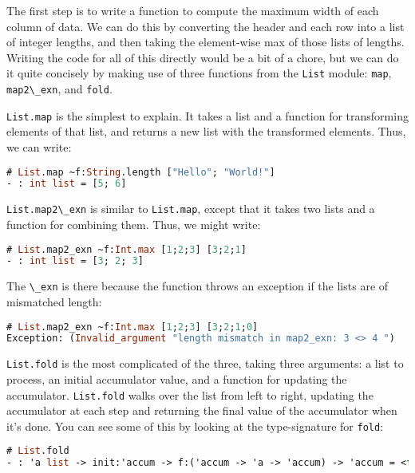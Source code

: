 The first step is to write a function to compute the maximum width of
each column of data. We can do this by converting the header and each
row into a list of integer lengths, and then taking the element-wise max
of those lists of lengths. Writing the code for all of this directly
would be a bit of a chore, but we can do it quite concisely by making
use of three functions from the \passthrough{\lstinline!List!} module:
\passthrough{\lstinline!map!}, \passthrough{\lstinline!map2\_exn!}, and
\passthrough{\lstinline!fold!}.

\passthrough{\lstinline!List.map!} is the simplest to explain. It takes
a list and a function for transforming elements of that list, and
returns a new list with the transformed elements. Thus, we can
write:

\begin{lstlisting}[language=Caml]
# List.map ~f:String.length ["Hello"; "World!"]
- : int list = [5; 6]
\end{lstlisting}

\passthrough{\lstinline!List.map2\_exn!} is similar to
\passthrough{\lstinline!List.map!}, except that it takes two lists and a
function for combining them. Thus, we might write:

\begin{lstlisting}[language=Caml]
# List.map2_exn ~f:Int.max [1;2;3] [3;2;1]
- : int list = [3; 2; 3]
\end{lstlisting}

The \passthrough{\lstinline!\_exn!} is there because the function throws
an exception if the lists are of mismatched length:

\begin{lstlisting}[language=Caml]
# List.map2_exn ~f:Int.max [1;2;3] [3;2;1;0]
Exception: (Invalid_argument "length mismatch in map2_exn: 3 <> 4 ")
\end{lstlisting}

\passthrough{\lstinline!List.fold!} is the most complicated of the
three, taking three arguments: a list to process, an initial accumulator
value, and a function for updating the accumulator.
\passthrough{\lstinline!List.fold!} walks over the list from left to
right, updating the accumulator at each step and returning the final
value of the accumulator when it's done. You can see some of this by
looking at the type-signature for
\passthrough{\lstinline!fold!}:

\begin{lstlisting}[language=Caml]
# List.fold
- : 'a list -> init:'accum -> f:('accum -> 'a -> 'accum) -> 'accum = <fun>
\end{lstlisting}

